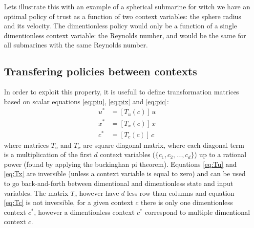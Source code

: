 Lets illustrate this with an example of a spherical submarine for witch we have an optimal policy of trust as a function of two context variables: the sphere radius and its velocity. The dimentionless policy would only be a function of a single dimentionless context variable: the Reynolds number, and would be the same for all submarines with the same Reynolds number. 

\subsection{Transfering policies between contexts}

In order to exploit this property, it is usefull to define transformation matrices based on scalar equations \eqref{eq:piu}, \eqref{eq:pix} and \eqref{eq:pic}:
\begin{align}
u^* &= \left[ T_u(c) \right] \, u  \label{eq:Tu} \\
x^* &= \left[ T_x(c) \right] \, x \label{eq:Tx} \\
c^* &= \left[ T_c(c) \right] \, c \label{eq:Tc}
\end{align}
where matrices $T_u$ and $T_x$ are square diagonal matrix, where each diagonal term is a multiplication of the first $d$ context variables ($\{c_1, c_2 , \hdots,c_d\}$) up to a rational power (found by applying the buckinghan pi theorem). Equations \eqref{eq:Tu} and \eqref{eq:Tx} are inversible (unless a context variable is equal to zero) and can be used to go back-and-forth between dimentional and dimentionless state and input variables. The matrix $T_c$ however have $d$ less row than columns and equation \eqref{eq:Tc} is not inversible, for a given context $c$ there is only one dimentionless context $c^*$, however a dimentionless context $c^*$ correspond to multiple dimentional context $c$.

